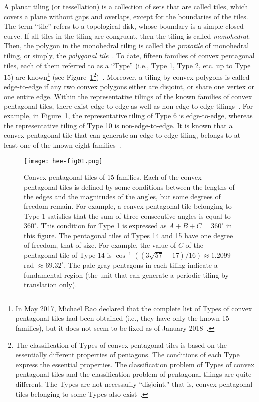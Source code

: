\documentclass[11pt, a4paper]{article}
\begin{document}
A planar tiling (or tessellation) is a collection of sets that are called 
tiles, which covers a plane without gaps and overlaps, except for the 
boundaries of the tiles. The term ``tile'' refers to a 
topological disk, whose boundary is a simple closed curve. If all tiles in 
the tiling are congruent, then the tiling is called \textit{monohedral}. Then, the 
polygon in the monohedral tiling is called the \textit{prototile} of monohedral 
tiling, or simply, the \textit{polygonal tile}~\cite{G_and_S_1987, Sugimoto_2012}. 
To date, fifteen families of convex pentagonal tiles, each of them 
referred to as a ``Type'' (i.e., Type 1, Type 2, etc. up to Type 15) are 
known\footnote{ In May 2017, Micha\"{e}l Rao declared that the complete 
list of Types of convex pentagonal tiles had been obtained (i.e., they have 
only the known 15 families), but it does not seem to be fixed as of January 
2018~\cite{Rao_2017, Wiki_PenTP}.} (see Figure~\ref{fig01}\footnote{ The 
classification of Types of convex pentagonal tiles is based on the essentially 
different properties of pentagons. The conditions of each Type express 
the essential properties. The classification problem of Types of convex 
pentagonal tiles and the classification problem of pentagonal tilings 
are quite different. The Types are not necessarily ``disjoint," that is, 
convex pentagonal tiles belonging to some Types also exist~\cite{Sugimoto_2012, 
Sugimoto_2016}.})~\cite{G_and_S_1987, Mann_2015, Rao_2017, Sugimoto_2012, 
Sugimoto_2017, Wiki_PenTP}. Moreover, a tiling by convex polygons is called 
edge-to-edge if any two convex polygons either are disjoint, or share 
one vertex or one entire edge. Within the representative tilings of the 
known families of convex pentagonal tiles, there exist edge-to-edge 
as well as non-edge-to-edge tilings~\cite{Sugimoto_2012, 
Sugimoto_2017, Wiki_PenTP}. For example, in Figure~\ref{fig01}, 
the representative tiling of Type 6 is edge-to-edge, whereas 
the representative tiling of Type 10 is non-edge-to-edge.
It is known that a convex pentagonal tile that can generate an 
edge-to-edge tiling, belongs to at least one of the 
known eight families~\cite{Bagina_2011, Sugimoto_2016}. 


\renewcommand{\figurename}{{\small Figure.}}
\begin{figure}[htbp]
 \centering\texttt{[image: hee-fig01.png]} 
  \caption{{\small 
Convex pentagonal tiles of 15 families. Each of the convex pentagonal 
tiles is defined by some conditions between the lengths of the edges and the 
magnitudes of the angles, but some degrees of freedom remain. For example, a 
convex pentagonal tile belonging to Type 1 satisfies that the sum of three 
consecutive angles is equal to $360^ \circ$. This condition for Type 1 is 
expressed as $A+B+C=360^ \circ$ in this figure. The pentagonal tiles of Types 14 
and 15 have one degree of freedom, that of size. For example, the value of 
$C$ of the pentagonal tile of Type 14 is $\cos ^{ - 1}((3\sqrt {57} - 17) / 16) 
\approx 1.2099\;$rad $ \approx 69.32^ \circ $. The pale gray pentagons in 
each tiling indicate a fundamental region (the unit that can generate a 
periodic tiling by translation only).} 
\label{fig01}
}
\end{figure}
\end{document}
